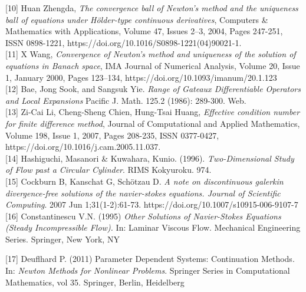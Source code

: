 \documentclass[11pt,twoside,a4paper]{article}
\begin{document}
[10] Huan Zhengda, \textit{The convergence ball of Newton's method and the uniqueness ball of equations under Hölder-type continuous derivatives},
Computers \& Mathematics with Applications,
Volume 47, Issues 2–3,
2004,
Pages 247-251,
ISSN 0898-1221,
https://doi.org/10.1016/S0898-1221(04)90021-1.\\

[11] X Wang, \textit{Convergence of Newton's method and uniqueness of the solution of equations in Banach space}, IMA Journal of Numerical Analysis, Volume 20, Issue 1, January 2000, Pages 123–134, https://doi.org/10.1093/imanum/20.1.123\\

[12] Bae, Jong Sook, and Sangsuk Yie. \textit{Range of Gateaux Differentiable Operators and Local Expansions}  Pacific J. Math. 125.2 (1986): 289-300. Web.\\

[13] Zi-Cai Li, Cheng-Sheng Chien, Hung-Tsai Huang,\textit{
Effective condition number for finite difference method},
Journal of Computational and Applied Mathematics,
Volume 198, Issue 1,
2007,
Pages 208-235,
ISSN 0377-0427,
https://doi.org/10.1016/j.cam.2005.11.037.\\

[14] Hashiguchi, Masanori \& Kuwahara, Kunio. (1996). \textit{Two-Dimensional Study of Flow past a Circular Cylinder}. RIMS Kokyuroku. 974. \\

[15] Cockburn B, Kanschat G, Schötzau D. \textit{A note on discontinuous galerkin divergence-free solutions of the navier-stokes equations. Journal of Scientific Computing}. 2007 Jun 1;31(1-2):61-73. https://doi.org/10.1007/s10915-006-9107-7\\

[16] Constantinescu V.N. (1995) \textit{Other Solutions of Navier-Stokes Equations (Steady Incompressible Flow).} In: Laminar Viscous Flow. Mechanical Engineering Series. Springer, New York, NY

[17] Deuflhard P. (2011) Parameter Dependent Systems: Continuation Methods. In: \textit{Newton Methods for Nonlinear Problems}. Springer Series in Computational Mathematics, vol 35. Springer, Berlin, Heidelberg
\end{document}
